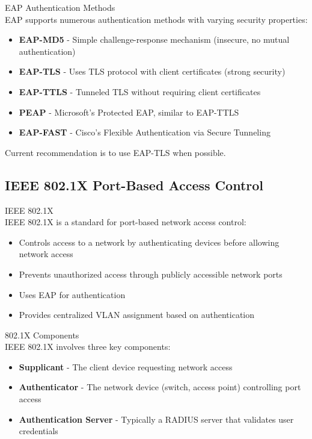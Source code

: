 \begin{concept}{EAP Authentication Methods}\\
EAP supports numerous authentication methods with varying security properties:
\begin{itemize}
    \item \textbf{EAP-MD5} - Simple challenge-response mechanism (insecure, no mutual authentication)
    \item \textbf{EAP-TLS} - Uses TLS protocol with client certificates (strong security)
    \item \textbf{EAP-TTLS} - Tunneled TLS without requiring client certificates
    \item \textbf{PEAP} - Microsoft's Protected EAP, similar to EAP-TTLS
    \item \textbf{EAP-FAST} - Cisco's Flexible Authentication via Secure Tunneling
\end{itemize}
Current recommendation is to use EAP-TLS when possible.
\end{concept}

\subsection{IEEE 802.1X Port-Based Access Control}

\begin{definition}{IEEE 802.1X}\\
IEEE 802.1X is a standard for port-based network access control:
\begin{itemize}
    \item Controls access to a network by authenticating devices before allowing network access
    \item Prevents unauthorized access through publicly accessible network ports
    \item Uses EAP for authentication
    \item Provides centralized VLAN assignment based on authentication
\end{itemize}
\end{definition}

\begin{concept}{802.1X Components}\\
IEEE 802.1X involves three key components:
\begin{itemize}
    \item \textbf{Supplicant} - The client device requesting network access
    \item \textbf{Authenticator} - The network device (switch, access point) controlling port access
    \item \textbf{Authentication Server} - Typically a RADIUS server that validates user credentials
\end{itemize}
\end{concept}

